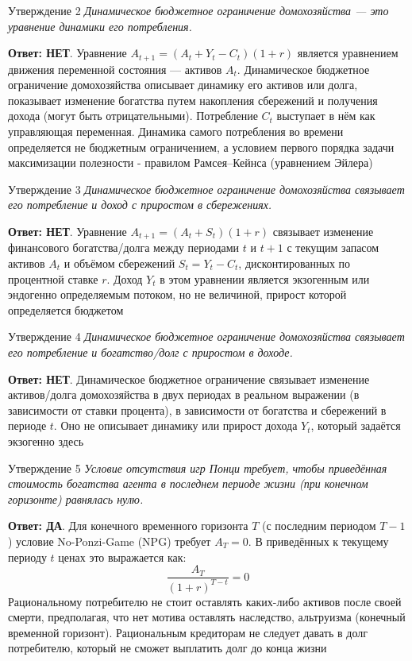 \documentclass[10pt,a4paper]{article}
\newcommand{\qda}{\textbf{\color{yesgreen}Ответ: ДА}}
\newcommand{\qnet}{\textbf{\color{nored}Ответ: НЕТ}}
\newenvironment{answer}[2]{%
  \begin{qbox}{Утверждение #1}
  \textit{#2}\par\smallskip
}{%
  \end{qbox}\vspace{2pt}
}
\begin{document}
\begin{answer}{2}{Динамическое бюджетное ограничение домохозяйства — это уравнение динамики его потребления.}
\qnet. Уравнение $A_{t+1} = (A_t + Y_t - C_t)(1+r)$ является уравнением движения переменной состояния — активов $A_t$. Динамическое бюджетное ограничение
домохозяйства описывает динамику его активов или долга, показывает изменение
богатства путем накопления сбережений и получения дохода (могут быть
отрицательными). Потребление $C_t$ выступает в нём как управляющая переменная. Динамика самого потребления во времени определяется не бюджетным ограничением, а условием первого порядка задачи максимизации полезности - правилом Рамсея–Кейнса (уравнением Эйлера)
\end{answer}

\begin{answer}{3}{Динамическое бюджетное ограничение домохозяйства связывает его потребление и доход с приростом в сбережениях.}
\qnet. Уравнение $A_{t+1} = (A_t + S_t)(1+r)$ связывает изменение финансового богатства/долга между периодами $t$ и $t+1$ с текущим запасом активов $A_t$ и объёмом сбережений $S_t = Y_t - C_t$, дисконтированных по процентной ставке $r$. Доход $Y_t$ в этом уравнении является экзогенным или эндогенно определяемым потоком, но не величиной, прирост которой определяется бюджетом
\end{answer}

\begin{answer}{4}{Динамическое бюджетное ограничение домохозяйства связывает его потребление и богатство/долг с приростом в доходе.}
\qnet. Динамическое бюджетное ограничение связывает изменение активов/долга домохозяйства в двух периодах в реальном выражении (в зависимости от ставки процента), в зависимости от богатства и сбережений в периоде $t$. Оно не описывает динамику или прирост дохода $Y_t$, который задаётся экзогенно здесь
\end{answer}

\begin{answer}{5}{Условие отсутствия игр Понци требует, чтобы приведённая стоимость богатства агента в последнем периоде жизни (при конечном горизонте) равнялась нулю.}
\qda. Для конечного временного горизонта $T$ (с последним периодом $T-1$) условие No-Ponzi-Game (NPG) требует $A_T = 0$. В приведённых к текущему периоду $t$ ценах это выражается как:
\[
\frac{A_T}{(1+r)^{T-t}} = 0
\]
Рациональному потребителю не стоит оставлять каких-либо активов после своей
смерти, предполагая, что нет мотива оставлять наследство, альтруизма (конечный
временной горизонт). Рациональным кредиторам не следует давать в долг потребителю,
который не сможет выплатить долг до конца жизни
\end{answer}
\end{document}
